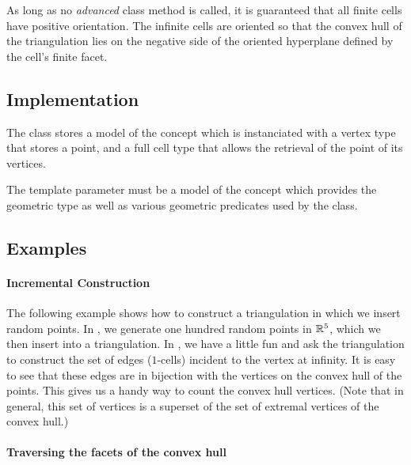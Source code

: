 As long as no \emph{advanced} class method is called, it is guaranteed that
all finite cells have positive orientation. The infinite cells are
oriented so that the convex hull of the triangulation lies on the negative side of
the oriented hyperplane defined by the cell's finite facet.



\subsection{Implementation}

The class  stores a model 
of the concept  which is instanciated with a
vertex type that stores a point, and a full cell type that allows the retrieval
of the point of its vertices.

The template parameter  must be a model of the concept
 which provides the geometric  type as well
as various geometric predicates used by the  class.


\subsection{Examples}

\paragraph{Incremental Construction}

The following example shows how to construct a triangulation in which we insert
random points. In , we generate one hundred random points in
$\mathbb R^5$, which we then insert into a triangulation. In , we have
a little fun and ask the triangulation to construct the set of edges
($1$-cells) incident to the vertex at infinity. It is easy to see that
these edges are in bijection with the vertices on the convex hull of the
points. This gives us a handy way to count the convex hull vertices. (Note that
in general, this set of vertices is a superset of the set of extremal vertices
of the convex hull.)


\paragraph{Traversing the facets of the convex hull}


